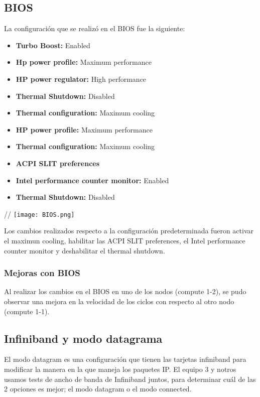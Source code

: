\subsection{BIOS}

La configuración que se realizó en el BIOS fue la siguiente:

\begin{itemize}
    \item \textbf{Turbo Boost:} Enabled
    \item \textbf{Hp power profile:} Maximum performance
    \item \textbf{HP power regulator:} High performance 
    \item \textbf{Thermal Shutdown:} Disabled
    \item \textbf{Thermal configuration:} Maximum cooling
    \item \textbf{HP power profile:} Maximum performance
    \item \textbf{Thermal configuration:} Maximum cooling
    \item \textbf{ACPI SLIT preferences}
    \item \textbf{Intel performance counter monitor:} Enabled
    \item \textbf{Thermal Shutdown:} Disabled
\end{itemize}//
\texttt{[image: BIOS.png]}

Los cambios realizados respecto a la configuración predeterminada fueron activar el maximun cooling, habilitar las ACPI SLIT preferences, el Intel performance counter monitor y deshabilitar el thermal shutdown.

\subsubsection{Mejoras con BIOS}

Al realizar los cambios en el BIOS en uno de los nodos (compute 1-2), se pudo observar una mejora en la velocidad de los ciclos con respecto al otro nodo (compute 1-1).

\subsection{Infiniband y modo datagrama}

El modo datagram es una configuración que tienen las tarjetas infiniband para modificar la manera en la que maneja los paquetes IP. El equipo 3 y notros usamos tests de ancho de banda de Infiniband juntos, para determinar cuál de las 2 opciones es mejor; el modo datagram o el modo connected. 

